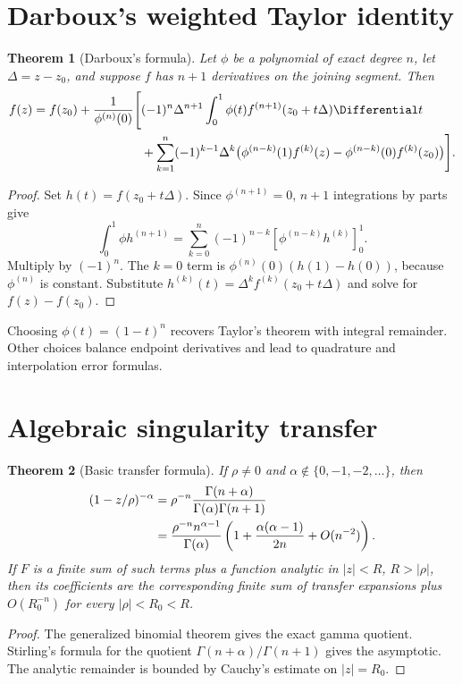 \documentclass[11pt,a4paper,oneside,openany]{book}
\newtheorem{theorem}{Theorem}[chapter]
\theoremstyle{definition}
\theoremstyle{remark}
\begin{document}
\section{Darboux's weighted Taylor identity}

\begin{theorem}[Darboux's formula]
\label{unif:thm-darboux-weighted}
Let $\phi$ be a polynomial of exact degree $n$, let
$\Delta=z-z_0$, and suppose $f$ has $n+1$ derivatives on the joining segment.
Then
\begin{align}
 f(z)=f(z_0)+\frac1{\phi^{(n)}(0)}\Bigg[&
 (-1)^n\Delta^{n+1}\int_0^1\phi(t)
 f^{(n+1)}(z_0+t\Delta)\Differential t
 \notag\\
 &+\sum_{k=1}^{n}(-1)^{k-1}\Delta^k
 \bigl(\phi^{(n-k)}(1)f^{(k)}(z)
 -\phi^{(n-k)}(0)f^{(k)}(z_0)\bigr)\Bigg].
 \label{unif:eq-darboux-weighted}
\end{align}
\end{theorem}
\begin{proof}
Set $h(t)=f(z_0+t\Delta)$. Since $\phi^{(n+1)}=0$, $n+1$ integrations by
parts give
\[
 \int_0^1\phi h^{(n+1)}
 =\sum_{k=0}^{n}(-1)^{n-k}
 [\phi^{(n-k)}h^{(k)}]_0^1.
\]
Multiply by $(-1)^n$. The $k=0$ term is
$\phi^{(n)}(0)(h(1)-h(0))$, because $\phi^{(n)}$ is constant. Substitute
$h^{(k)}(t)=\Delta^kf^{(k)}(z_0+t\Delta)$ and solve for $f(z)-f(z_0)$.
\end{proof}

Choosing $\phi(t)=(1-t)^n$ recovers Taylor's theorem with integral remainder.
Other choices balance endpoint derivatives and lead to quadrature and
interpolation error formulas.

\section{Algebraic singularity transfer}

\begin{theorem}[Basic transfer formula]
\label{unif:thm-basic-transfer}
If $\rho\ne0$ and
$\alpha\notin\{0,-1,-2,\ldots\}$, then
\begin{align}
 [z^n](1-z/\rho)^{-\alpha}
 &=\rho^{-n}\frac{\Gamma(n+\alpha)}{\Gamma(\alpha)\Gamma(n+1)}
 \notag\\
 &=\frac{\rho^{-n}n^{\alpha-1}}{\Gamma(\alpha)}
 \left(1+\frac{\alpha(\alpha-1)}{2n}+O(n^{-2})\right).
 \label{unif:eq-basic-transfer}
\end{align}
If $F$ is a finite sum of such terms plus a function analytic in $|z|<R$,
$R>|\rho|$, then its coefficients are the corresponding finite sum of transfer
expansions plus $O(R_0^{-n})$ for every $|\rho|<R_0<R$.
\end{theorem}
\begin{proof}
The generalized binomial theorem gives the exact gamma quotient. Stirling's
formula for the quotient $\Gamma(n+\alpha)/\Gamma(n+1)$ gives the asymptotic.
The analytic remainder is bounded by Cauchy's estimate on $|z|=R_0$.
\end{proof}
\end{document}
